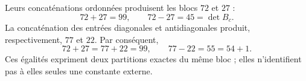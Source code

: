 Leurs concaténations ordonnées produisent les blocs \(72\) et \(27\) :
\[
72+27=99,
\qquad
72-27=45=\det B_c.
\]
La concaténation des entrées diagonales et antidiagonales produit,
respectivement, \(77\) et \(22\). Par conséquent,
\[
72+27=77+22=99,
\qquad
77-22=55=54+1.
\]
Ces égalités expriment deux partitions exactes du même bloc ; elles
n'identifient pas à elles seules une constante externe.
